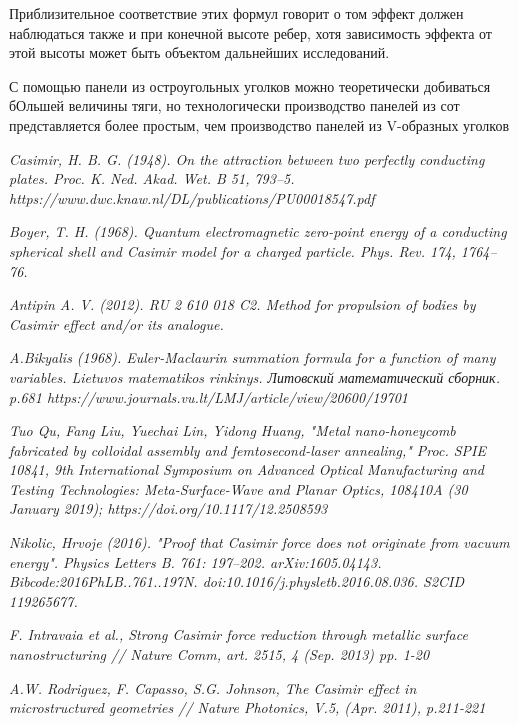 \documentclass[11pt]{article}
\begin{document}
Приблизительное соответствие этих формул говорит о том эффект должен
наблюдаться также и при конечной высоте ребер, хотя зависимость эффекта
от этой высоты может быть объектом дальнейших исследований.

С помощью панели из остроугольных уголков можно теоретически добиваться
бОльшей величины тяги, но технологически производство панелей из сот
представляется более простым, чем производство панелей из V-образных
уголков

    \begin{thebibliography}{99}

\textit{Casimir, H. B. G. (1948). On the attraction between two perfectly conducting plates. Proc. K. Ned. Akad. Wet. B 51, 793–5.
https://www.dwc.knaw.nl/DL/publications/PU00018547.pdf}

\textit{Boyer, T. H. (1968). Quantum electromagnetic zero-point energy of a conducting spherical shell and Casimir model for a charged particle. Phys. Rev. 174, 1764–76.}

\textit{Antipin A. V. (2012). RU 2 610 018 C2. Method for propulsion of bodies by Casimir effect and/or its analogue.}

\textit{A.Bikyalis (1968). Euler-Maclaurin summation formula for a function of many variables.  Lietuvos matematikos rinkinys. Литовский математический сборник. p.681
https://www.journals.vu.lt/LMJ/article/view/20600/19701}

\textit{Tuo Qu, Fang Liu, Yuechai Lin, Yidong Huang, "Metal nano-honeycomb fabricated by colloidal assembly and femtosecond-laser annealing," Proc. SPIE 10841, 9th International Symposium on Advanced Optical Manufacturing and Testing Technologies: Meta-Surface-Wave and Planar Optics, 108410A (30 January 2019); https://doi.org/10.1117/12.2508593}

\textit{Nikolic, Hrvoje (2016). "Proof that Casimir force does not originate from vacuum energy". Physics Letters B. 761: 197–202. arXiv:1605.04143. Bibcode:2016PhLB..761..197N. doi:10.1016/j.physletb.2016.08.036. S2CID 119265677.}

\textit{F. Intravaia et al., Strong Casimir force reduction through metallic surface nanostructuring // Nature Comm, art. 2515, 4 (Sep. 2013) pp. 1-20}

\textit{A.W. Rodriguez, F. Capasso, S.G. Johnson, The Casimir effect in microstructured geometries // Nature Photonics, V.5, (Apr. 2011), p.211-221}

\end{thebibliography}


    
    
    
\end{document}
